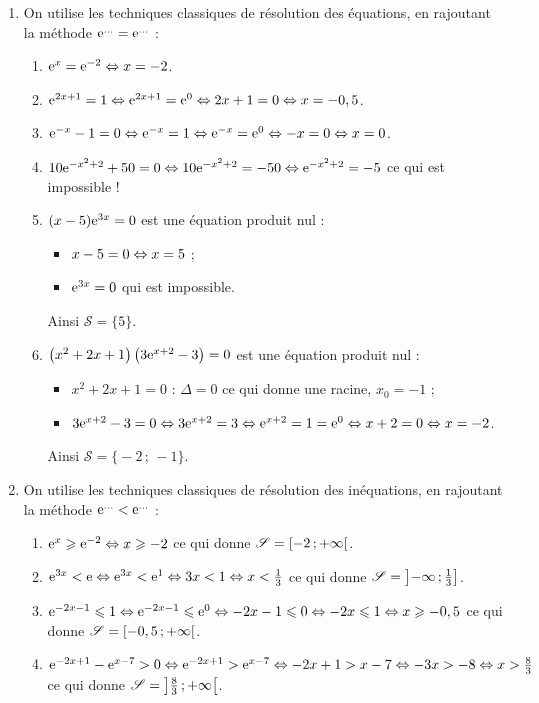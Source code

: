 \documentclass[a4paper,11pt]{article}
\begin{document}
\begin{enumerate}
	\item On utilise les techniques classiques de résolution des équations, en \og rajoutant \fg{} la méthode \og ${\rm e}^{\ldots} = {\rm e}^{\ldots}$ \fg{} :
	\begin{enumerate}
		\item ${\rm e}^{x}={\rm e}^{-2} \Leftrightarrow x = -2$.
		\item ${\rm e}^{2x+1}=1 \Leftrightarrow {\rm e}^{2x+1} = {\rm e}^0 \Leftrightarrow 2x+1 = 0 \Leftrightarrow x=-0,5$.
		\item ${\rm e}^{-x}-1=0 \Leftrightarrow {\rm e}^{-x}=1 \Leftrightarrow {\rm e}^{-x} = {\rm e}^0 \Leftrightarrow -x = 0 \Leftrightarrow x=0$.
		\item $10{\rm e}^{-x^2+2}+50=0 \Leftrightarrow 10{\rm e}^{-x^2+2}=-50 \Leftrightarrow {\rm e}^{-x^2+2} = -5$ ce qui est impossible !
		\item $(x-5){\rm e}^{3x}=0$ est une équation produit nul :
		\begin{itemize}
			\item $x-5=0 \Leftrightarrow x=5$ ;
			\item ${\rm e}^{3x}=0$ qui est impossible.
		\end{itemize}
		Ainsi $\mathscr{S}=\bigl\{ 5 \bigr\}$.
		\item $\left(x^2+2x+1\right)\left( 3{\rm e}^{x+2}-3 \right)=0$ est une équation produit nul :
		\begin{itemize}
			\item $x^2+2x+1=0$ : $\Delta = 0$ ce qui donne une racine, $x_0=-1$ ;
			\item $3{\rm e}^{x+2}-3=0 \Leftrightarrow 3{\rm e}^{x+2}=3 \Leftrightarrow {\rm e}^{x+2}=1={\rm e}^0 \Leftrightarrow x+2=0 \Leftrightarrow x=-2$.
		\end{itemize}
		Ainsi $\mathscr{S}=\bigl\{ -2\,;\,-1 \bigr\}$.
	\end{enumerate}
	\pagebreak
	\item On utilise les techniques classiques de résolution des inéquations, en \og rajoutant \fg{} la méthode \og ${\rm e}^{\ldots} < {\rm e}^{\ldots}$ \fg{} :
	\begin{enumerate}
		\item ${\rm e}^{x} \geqslant {\rm e}^{-2} \Leftrightarrow x \geqslant -2$ ce qui donne $\mathscr{S}=\mbox{\ensuremath{\left[-2\mathpunct{};+\infty\right[}}$.
		\item ${\rm e}^{3x} < {\rm e} \Leftrightarrow {\rm e}^{3x} < {\rm e}^1 \Leftrightarrow 3x < 1 \Leftrightarrow x < \tfrac{1}{3}$ ce qui donne $\mathscr{S}=\mbox{\ensuremath{\left]-\infty\mathpunct{};\tfrac{1}{3}\right]}}$.
		\item ${\rm e}^{-2x-1} \leqslant 1 \Leftrightarrow {\rm e}^{-2x-1} \leqslant {\rm e}^0 \Leftrightarrow -2x-1 \leqslant 0 \Leftrightarrow -2x \leqslant 1 \Leftrightarrow x \geqslant -0,5$ ce qui donne $\mathscr{S}=\mbox{\ensuremath{\left[-0,5\mathpunct{};+\infty\right[}}$.
		\item ${\rm e}^{-2x+1} -{\rm e}^{x-7} > 0 \Leftrightarrow {\rm e}^{-2x+1} > {\rm e}^{x-7} \Leftrightarrow -2x+1 > x-7 \Leftrightarrow -3x > -8 \Leftrightarrow x > \tfrac{8}{3}$ ce qui donne $\mathscr{S}=\mbox{\ensuremath{\left]\tfrac{8}{3}\mathpunct{};+\infty\right[}}$.

\end{enumerate}
\end{enumerate}
\end{document}
